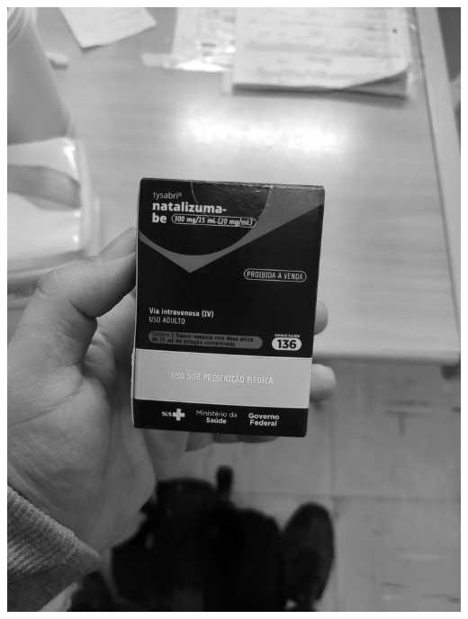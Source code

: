 \begin{frame}
\begin{columns}
\begin{column}{0.24\textwidth}
			\includegraphics[height=0.35\textheight]{../pictures/tysabri_rgb_r_only.jpg}
			\\\vspace{\floatsep}

\end{column}
\end{columns}
\end{frame}

